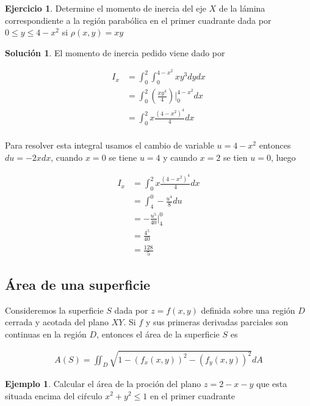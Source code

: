 \documentclass{article}
\theoremstyle{plain}
\theoremstyle{definition}
\newtheorem{ejem}[thm]{Ejemplo}
\newtheorem{ejer}[thm]{Ejercicio}
\newtheorem{sol}[thm]{Solución}
\begin{document}
\begin{ejer}Determine el momento de inercia del eje $X$ de la l\'amina correspondiente a la regi\'on parab\'olica en el primer cuadrante dada por  $0 \leq y \leq 4-x^2$ si $\rho(x,y) = xy$ \\
\end{ejer}

\begin{sol}El momento de inercia pedido viene dado por
\end{sol}

\begin{align*}
    I_x &= \int_{0}^2 \int_0^{4-x^2} xy^3 dy dx \\
    &= \int_{0}^2 \left(\frac{xy^4}{4}\right)\bigg|_0^{4-x^2} dx \\
    &= \int_{0}^2 x\frac{(4-x^2)^4}{4} dx \\
\end{align*}

Para resolver esta integral usamos el cambio de variable $u=4-x^2$ entonces $du=-2xdx$, cuando $x=0$ se tiene $u=4$ y caundo $x=2$ se tien $u=0$, luego


\begin{align*}
    I_x &= \int_{0}^2 x\frac{(4-x^2)^4}{4} dx \\
    &= \int_{4}^0 -\frac{u^4}{8} du \\
    &= -\frac{u^5}{40}\bigg|_4^0 \\
    &=\frac{4^5}{40} \\
    &= \frac{128}{5}
\end{align*}


\newpage


\subsection{Área de una superficie}

Consideremos la superficie $S$ dada por $z=f(x,y)$ definida sobre una regi\'on  $D$ cerrada y acotada del plano $XY$. Si $f$ y sus primeras derivadas parciales son continuas en la regi\'on $D$, entonces el \'area de la superficie $S$ es

\begin{align*}
    A(S) = \iint_{D} \sqrt{1-(f_x(x,y))^2-(f_y(x,y))^2} dA
\end{align*}


\begin{ejem}Calcular el \'area de la proci\'on del plano $z=2-x-y$ que esta situada encima del ci\'rculo $x^2+y^2 \leq 1$ en el primer cuadrante \\
\end{ejem}
\end{document}
